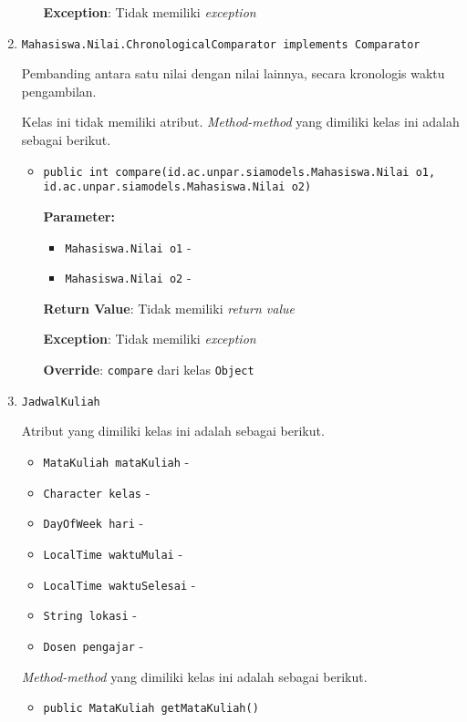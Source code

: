 \documentclass{article}
\begin{document}
\begin{enumerate}
\begin{itemize}
\textbf{Exception}: Tidak memiliki \textit{exception}

\end{itemize}
\item \texttt{Mahasiswa.Nilai.ChronologicalComparator implements Comparator}

Pembanding antara satu nilai dengan nilai lainnya, secara
 kronologis waktu pengambilan.

Kelas ini tidak memiliki atribut. \textit{Method-method} yang dimiliki kelas ini adalah sebagai berikut.
\begin{itemize}
\item \texttt{public int compare(id.ac.unpar.siamodels.Mahasiswa.Nilai o1, id.ac.unpar.siamodels.Mahasiswa.Nilai o2)}



\textbf{Parameter:}
\begin{itemize}
\item \texttt{Mahasiswa.Nilai o1} - 
\item \texttt{Mahasiswa.Nilai o2} - 
\end{itemize}
\textbf{Return Value}: Tidak memiliki \textit{return value}

\textbf{Exception}: Tidak memiliki \textit{exception}

\textbf{Override}: \texttt{compare} dari kelas \texttt{Object}

\end{itemize}
\item \texttt{JadwalKuliah}



Atribut yang dimiliki kelas ini adalah sebagai berikut.
\begin{itemize}
\item \texttt{MataKuliah mataKuliah} - 
\item \texttt{Character kelas} - 
\item \texttt{DayOfWeek hari} - 
\item \texttt{LocalTime waktuMulai} - 
\item \texttt{LocalTime waktuSelesai} - 
\item \texttt{String lokasi} - 
\item \texttt{Dosen pengajar} - 
\end{itemize}
\textit{Method-method} yang dimiliki kelas ini adalah sebagai berikut.
\begin{itemize}
\item \texttt{public MataKuliah getMataKuliah()}




\end{itemize}
\end{enumerate}
\end{document}
